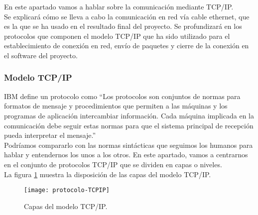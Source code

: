 En este apartado vamos a hablar sobre la comunicación mediante TCP/IP. \\
Se explicará cómo se lleva a cabo la comunicación en red vía cable ethernet, que es la que se ha usado en el resultado final del proyecto. Se profundizará en los protocolos que componen el modelo TCP/IP \cite{avastTcpIp} que ha sido utilizado para el establecimiento de conexión en red, envío de paquetes y cierre de la conexión en el software del proyecto. \\


\subsubsection{Modelo TCP/IP}
IBM \cite{IBMTCP} define un protocolo como ``Los protocolos son conjuntos de normas para formatos de mensaje y procedimientos que permiten a las máquinas y los programas de aplicación intercambiar información. Cada máquina implicada en la comunicación debe seguir estas normas para que el sistema principal de recepción pueda interpretar el mensaje.'' \\
Podríamos compararlo con las normas sintácticas que seguimos los humanos para hablar y entendernos los unos a los otros. En este apartado, vamos a centrarnos en el conjunto de protocolos TCP/IP que se dividen en capas o niveles. \\
La figura \ref{disposicionCapas} muestra la disposición de las capas del modelo TCP/IP.

\begin{figure}[!h]
	\centering
	\texttt{[image: protocolo-TCPIP]}
	\caption{Capas del modelo TCP/IP.}\label{disposicionCapas}
\end{figure}



